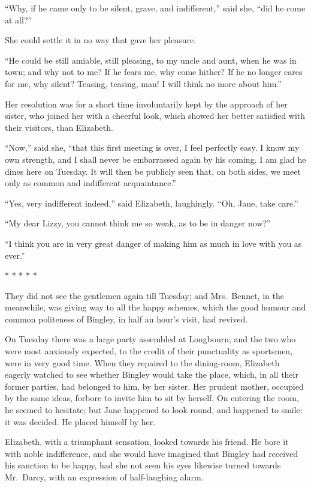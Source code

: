 ``Why, if he came only to be silent, grave, and indifferent,''
said she, ``did he come at all?''

She could settle it in no way that gave her pleasure.

``He could be still amiable, still pleasing, to my uncle and
aunt, when he was in town; and why not to me?  If he fears me,
why come hither?  If he no longer cares for me, why silent?
Teasing, teasing, man!  I will think no more about him.''

Her resolution was for a short time involuntarily kept by
the approach of her sister, who joined her with a cheerful
look, which showed her better satisfied with their visitors,
than Elizabeth.

``Now,'' said she, ``that this first meeting is over, I feel
perfectly easy.  I know my own strength, and I shall never be
embarrassed again by his coming.  I am glad he dines here on
Tuesday.  It will then be publicly seen that, on both sides,
we meet only as common and indifferent acquaintance.''

``Yes, very indifferent indeed,'' said Elizabeth, laughingly.
``Oh, Jane, take care.''

``My dear Lizzy, you cannot think me so weak, as to be in danger
now?''

``I think you are in very great danger of making him as much
in love with you as ever.''

\begin{center}* * * * *\end{center}

They did not see the gentlemen again till Tuesday; and
Mrs.\ Bennet, in the meanwhile, was giving way to all the
happy schemes, which the good humour and common politeness
of Bingley, in half an hour's visit, had revived.

On Tuesday there was a large party assembled at Longbourn;
and the two who were most anxiously expected, to the credit of
their punctuality as sportsmen, were in very good time.  When
they repaired to the dining-room, Elizabeth eagerly watched to
see whether Bingley would take the place, which, in all their
former parties, had belonged to him, by her sister.  Her
prudent mother, occupied by the same ideas, forbore to invite
him to sit by herself.  On entering the room, he seemed to
hesitate; but Jane happened to look round, and happened to
smile: it was decided.  He placed himself by her.

Elizabeth, with a triumphant sensation, looked towards his
friend.  He bore it with noble indifference, and she would have
imagined that Bingley had received his sanction to be happy,
had she not seen his eyes likewise turned towards Mr.\ Darcy,
with an expression of half-laughing alarm.

